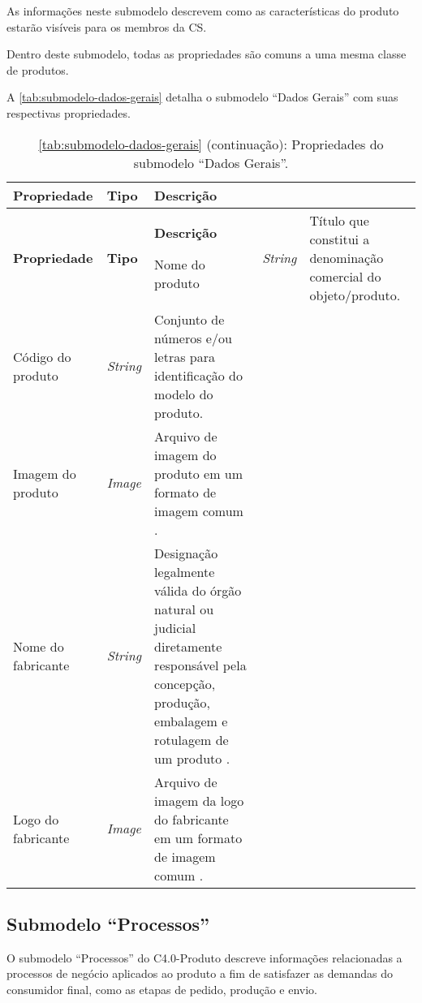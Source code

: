As informações neste submodelo descrevem como as características do produto estarão visíveis para os membros da CS.

Dentro deste submodelo, todas as propriedades são comuns a uma mesma classe de produtos.

A \autoref{tab:submodelo-dados-gerais} detalha o submodelo ``Dados Gerais'' com suas respectivas propriedades.

\begin{longtable}{|p{}|p{}|p{}|}

	\caption{\label{tab:submodelo-dados-gerais} Propriedades do submodelo ``Dados Gerais''.}
	\\ \hline \textbf{Propriedade} & \textbf{Tipo} & \textbf{Descrição}
	\endfirsthead

	\caption*{\autoref{tab:submodelo-dados-gerais} (continuação): Propriedades do submodelo ``Dados Gerais''.}
	\\ \hline \textbf{Propriedade} & \textbf{Tipo}   & \textbf{Descrição}
	\endhead

	\hline Nome do produto & \textit{String} & Título que constitui a denominação comercial do objeto/produto.

	\\ \hline Código do produto & \textit{String} & Conjunto de números e/ou letras para identificação do modelo do produto.

	\\ \hline Imagem do produto & \textit{Image} & Arquivo de imagem do produto em um formato de imagem comum \cite{bader2020submodel}.

	\\ \hline Nome do fabricante & \textit{String} & Designação legalmente válida do órgão natural ou judicial diretamente responsável pela concepção, produção, embalagem e rotulagem de um produto \cite{bader2020submodel}.

	\\ \hline Logo do fabricante & \textit{Image} & Arquivo de imagem da logo do fabricante em um formato de imagem comum \cite{bader2020submodel}.

	\\ \hline
\end{longtable}

\subsection{Submodelo ``Processos''}

O submodelo ``Processos'' do C4.0-Produto descreve informações relacionadas a processos de negócio aplicados ao produto a fim de satisfazer as demandas do consumidor final, como as etapas de pedido, produção e envio.

